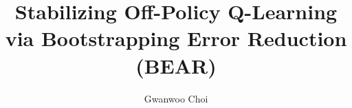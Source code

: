 \documentclass[11pt]{beamer}
\title{Stabilizing Off-Policy Q-Learning via Bootstrapping Error Reduction (BEAR)}
\author{Gwanwoo Choi} %
\institute{MLIC}
\newcommand{\mc}[1]{\mathcal{#1}}
\newcommand{\tb}[1]{\textbf{#1}}
\begin{document}
\begin{frame}
    \titlepage
\end{frame}



    
    

    
\end{document}
